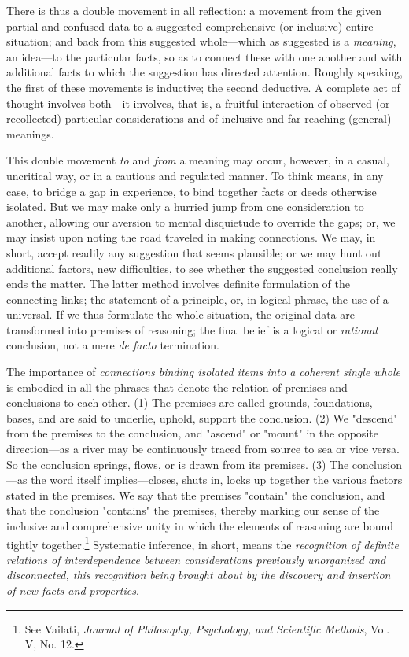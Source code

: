 \documentclass[letterpaper]{book}
\begin{document}

There is thus a double movement in all reflection: a movement from the
given partial and confused data to a suggested comprehensive (or
inclusive) entire situation; and back from this suggested whole---which
as suggested is a \emph{meaning}, an idea---to the particular facts, so
as to connect these with one another and with additional facts to which
the suggestion has directed attention. Roughly speaking, the first of
these
movements
is inductive; the second deductive. A complete act of thought involves
both---it involves, that is, a fruitful interaction of observed (or
recollected) particular considerations and of inclusive and far-reaching
(general) meanings.


This double movement \emph{to} and \emph{from} a meaning may occur,
however, in a casual, uncritical way, or in a cautious and regulated
manner. To think means, in any case, to bridge a gap in experience, to
bind together facts or deeds otherwise isolated. But we may make only a
hurried jump from one consideration to another, allowing our aversion to
mental disquietude to override the gaps; or, we may insist upon noting
the road traveled in making connections. We may, in short, accept
readily any suggestion that seems plausible; or we may hunt out
additional factors, new difficulties, to see whether the suggested
conclusion really ends the matter. The latter method involves definite
formulation of the connecting links; the statement of a principle, or,
in logical phrase, the use of a universal. If we thus formulate the
whole situation, the original data are transformed into premises of
reasoning; the final belief is a logical or \emph{rational} conclusion,
not a mere \emph{de facto} termination.


The importance of \emph{connections binding isolated items into a
coherent single whole} is embodied in all the phrases that denote the
relation of premises and conclusions to each other. (1) The premises are
called grounds, foundations, bases, and are said to underlie, uphold,
support the conclusion. (2) We "descend" from the premises to the
conclusion, and "ascend" or "mount" in the opposite direction---as a
river may be continuously traced from source to sea or vice versa. So
the conclusion springs, flows, or is drawn from its
premises.
(3) The conclusion---as the word itself implies---closes, shuts in,
locks up together the various factors stated in the premises. We say
that the premises "contain" the conclusion, and that the conclusion
"contains" the premises, thereby marking our sense of the inclusive and
comprehensive unity in which the elements of reasoning are bound tightly
together.\footnote{
See Vailati, \emph{Journal of Philosophy, Psychology, and Scientific
Methods}, Vol. V, No. 12.}
Systematic inference, in short, means the \emph{recognition of definite
relations of interdependence between considerations previously
unorganized and disconnected, this recognition being brought about by
the discovery and insertion of new facts and properties}.
\end{document}
